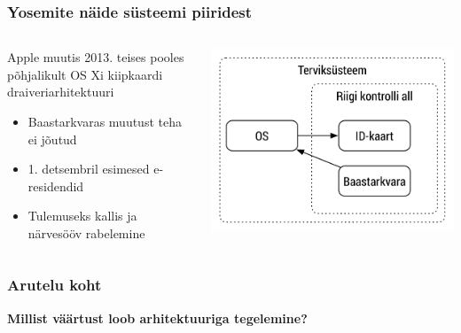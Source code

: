 \begin{frame}[label=Yosemite]
	\frametitle{Yosemite näide süsteemi piiridest}
	\begin{columns}[t]
		\begin{column}{6.5cm}
			Apple muutis 2013. teises pooles põhjalikult OS Xi kiipkaardi draiveriarhitektuuri
			\begin{itemize}
				\item Baastarkvaras muutust teha ei jõutud 
				\item 1. detsembril esimesed e-residendid
				\item Tulemuseks kallis ja närvesööv rabelemine
			\end{itemize}
		\end{column}
		\begin{column}[T]{4.5cm}
			\includegraphics[width=\textwidth]{yosemite.pdf}
		\end{column}
	\end{columns}
\end{frame}

\begin{frame}[fragile]
  \frametitle{Arutelu koht}
		\begin{center}
			\textbf{Millist väärtust loob arhitektuuriga tegelemine?}
		\end{center}
\end{frame}

